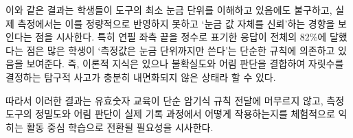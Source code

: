 이와 같은 결과는 학생들이 도구의 최소 눈금 단위를 이해하고 있음에도 불구하고,
실제 측정에서는 이를 정량적으로 반영하지 못하고 `눈금 값 자체를 신뢰'하는
경향을 보인다는 점을 시사한다.
%
특히 연필 좌측 끝을 정수로 표기한 응답이 전체의 82\%에 달했다는 점은 많은 학생이
`측정값은 눈금 단위까지만 쓴다'는 단순한 규칙에 의존하고 있음을 보여준다.
%
즉, 이론적 지식은 있으나 불확실도와 어림 판단을 결합하여 자릿수를 결정하는
탐구적 사고가 충분히 내면화되지 않은 상태라 할 수 있다.

따라서 이러한 결과는 유효숫자 교육이 단순 암기식 규칙 전달에 머무르지 않고,
측정 도구의 정밀도와 어림 판단이 실제 기록 과정에서 어떻게 작용하는지를
체험적으로 익히는 활동 중심 학습으로 전환될 필요성을 시사한다.